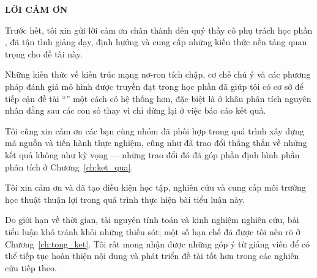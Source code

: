 \newpage
\thispagestyle{plain}

\begin{center}
    {\bfseries\Large LỜI CẢM ƠN}
\end{center}

\vspace{1cm}

Trước hết, tôi xin gửi lời cảm ơn chân thành đến quý thầy cô phụ trách học phần \coursename, đã
tận tình giảng dạy, định hướng và cung cấp những kiến thức nền tảng quan trọng cho đề tài này.

Những kiến thức về kiến trúc mạng nơ-ron tích chập, cơ chế chú ý và các phương pháp đánh giá mô
hình được truyền đạt trong học phần đã giúp tôi có cơ sở để tiếp cận đề tài
``\projecttitle''
một cách có hệ thống hơn, đặc biệt là ở khâu phân tích nguyên nhân đằng sau các con số thay vì chỉ
dừng lại ở việc báo cáo kết quả.

Tôi cũng xin cảm ơn các bạn cùng nhóm đã phối hợp trong quá trình xây dựng mã nguồn và tiến hành
thực nghiệm, cũng như đã trao đổi thẳng thắn về những kết quả không như kỳ vọng --- những trao đổi
đó đã góp phần định hình phần phân tích ở Chương~\ref{ch:ket_qua}.

Tôi xin cảm ơn \university{} và \faculty{} đã tạo điều kiện học tập, nghiên cứu và cung cấp môi
trường học thuật thuận lợi trong quá trình thực hiện bài tiểu luận này.

Do giới hạn về thời gian, tài nguyên tính toán và kinh nghiệm nghiên cứu, bài tiểu luận khó tránh
khỏi những thiếu sót; một số hạn chế đã được tôi nêu rõ ở Chương~\ref{ch:tong_ket}. Tôi rất mong
nhận được những góp ý từ giảng viên để có thể tiếp tục hoàn thiện nội dung và phát triển đề tài
tốt hơn trong các nghiên cứu tiếp theo.
